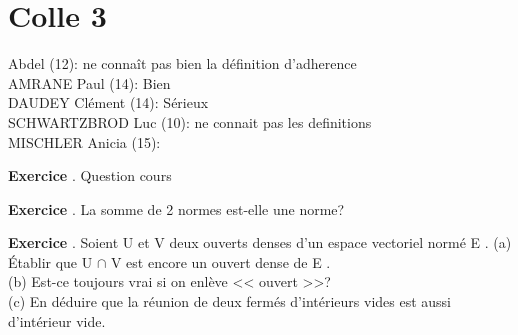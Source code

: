 \documentclass[10pt,a4paper]{article}
\newcounter{question}
\newcounter{exo}
\newenvironment{exo}{\vspace{0.5cm}\setcounter{question}{0}\addtocounter{exo}{1} \noindent \textbf{Exercice \theexo}. \normalsize }{\par}
\begin{document}
	\section*{Colle 3}
	\setcounter{exo}{0}
	Abdel (12): ne connaît pas bien la définition d'adherence\\
	AMRANE Paul (14): Bien\\
	DAUDEY Clément (14): Sérieux\\
	SCHWARTZBROD Luc (10): ne connait pas les definitions\\
	MISCHLER Anicia (15):\\
	
	\begin{exo}
		Question cours
	\end{exo}
	
	\begin{exo}
		La somme de 2 normes est-elle une norme?
	\end{exo}
	
	\begin{exo}
	Soient U et V deux ouverts denses d'un espace vectoriel normé E .
	(a) Établir que U $\cap$ V est encore un ouvert dense de E .\\
	(b) Est-ce toujours vrai si on enlève << ouvert >>?\\
	(c) En déduire que la réunion de deux fermés d'intérieurs vides est aussi
	d'intérieur vide.
	\end{exo}
	 
\end{document}
